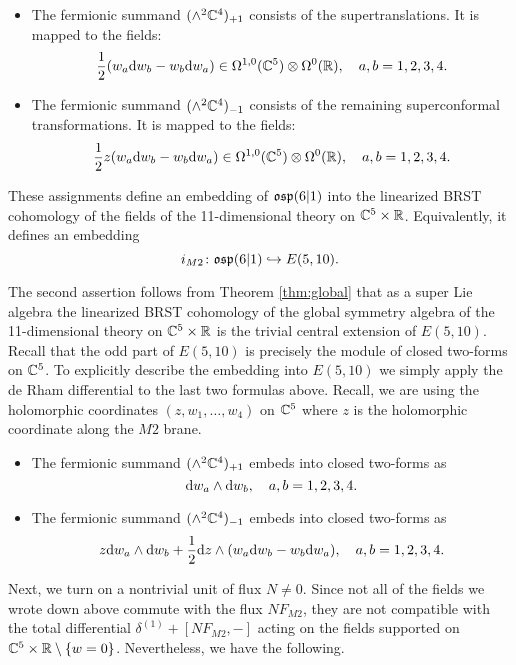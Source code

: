 \begin{itemize}
\item 
The fermionic summand $(\wedge^2 \mathbb C^4)_{+1}$ consists of the supertranslations. 
It is mapped to the fields: 
\[
\frac{1}{2} (w_a {\rm d} w_b - w_b {\rm d} w_a) \in \Omega^{1,0}(\mathbb C^5) \otimes \Omega^0(\mathbb R) , \quad a,b=1,2,3,4 .
\] 
\item The fermionic summand $(\wedge^2 \mathbb C^4)_{-1}$ consists of the remaining superconformal transformations. 
It is mapped to the fields: 
\[
\frac{1}{2} z (w_a {\rm d} w_b - w_b {\rm d} w_a) \in \Omega^{1,0}(\mathbb C^5) \otimes \Omega^0(\mathbb R) , \quad a,b=1,2,3,4. 
\] 
\end{itemize}


\begin{lem}
These assignments define an embedding of $\mathfrak{osp}(6|1)$ into the linearized BRST cohomology of the fields of the 11-dimensional theory on $\mathbb C^5 \times \mathbb R$. 
Equivalently, it defines an embedding
\[
i_{M2} \colon \mathfrak{osp}(6|1) \hookrightarrow E(5,10) .
\]
\end{lem} 

The second assertion follows from Theorem \ref{thm:global} that as a super Lie algebra the linearized BRST cohomology of the global symmetry algebra of the 11-dimensional theory on $\mathbb C^5 \times \mathbb R$ is the trivial central extension of $E(5,10)$. 
Recall that the odd part of $E(5,10)$ is precisely the module of closed two-forms on $\mathbb C^5$. 
To explicitly describe the embedding into $E(5,10)$ we simply apply the de Rham differential to the last two formulas above.
Recall, we are using the holomorphic coordinates $(z,w_1,\ldots,w_4)$ on $\mathbb C^5$ where $z$ is the holomorphic coordinate along the $M2$ brane. 
\begin{itemize}
\item 
The fermionic summand $(\wedge^2 \mathbb C^4)_{+1}$ embeds into closed two-forms as
\[
{\rm d} w_a \wedge {\rm d} w_b, \quad a,b=1,2,3,4. 
\] 
\item The fermionic summand $(\wedge^2 \mathbb C^4)_{-1}$ embeds into closed two-forms as
\[
z {\rm d} w_a  \wedge {\rm d} w_b + \frac12 {\rm d} z \wedge (w_a {\rm d} w_b - w_b {\rm d} w_a) , \quad a,b=1,2,3,4. 
\] 
\end{itemize}

\parsec[]

Next, we turn on a nontrivial unit of flux $N \ne 0$. 
Since not all of the fields we wrote down above commute with the flux $N F_{M2}$, they are not compatible with the total differential $\delta^{(1)} + [N F_{M2}, -]$ acting on the fields supported on $\mathbb C^5 \times \mathbb R \setminus \{w=0\}$. 
Nevertheless, we have the following. 

